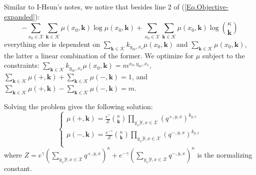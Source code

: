 \documentclass[12pt]{article}
\numberwithin{equation}{section}
\begin{document}
Similar to I-Hsun's notes, we notice that besides line 2 of (\ref{Eq.Objective-expanded}):
\begin{equation}
    - \sum_{x_0\in\mathcal{X}}\sum_{\mathbf{k}\in\mathcal{K}}\mu(x_0, \mathbf{k})\log\mu(x_0, \mathbf{k})
    + \sum_{x_0\in\mathcal{X}}\sum_{\mathbf{k}\in\mathcal{K}}\mu(x_0, \mathbf{k})\log{\kappa \choose \mathbf{k}}
    \label{Eq.EA-intermediate-obj}
\end{equation}
everything else is dependent on $\sum_{\mathbf{k}\in\mathcal{K}} k_{y_{0v}, x_v}\mu(x_0, \mathbf{k})$ and
$\sum_{\mathbf{k}\in\mathcal{K}}\mu(x_0, \mathbf{k})$, the latter a linear combination of the former. We optimize for $\mu$
subject to the constraints: $\sum_{\mathbf{k}\in\mathcal{K}} k_{y_{0v}, x_v}\mu(x_0, \mathbf{k}) = m^{x_0, y_{0v}, x_v}$,
$\sum_{\mathbf{k}\in\mathcal{K}}\mu(+, \mathbf{k}) + \sum_{\mathbf{k}\in\mathcal{K}}\mu(-, \mathbf{k}) = 1$, and
$\sum_{\mathbf{k}\in\mathcal{K}}\mu(+, \mathbf{k}) - \sum_{\mathbf{k}\in\mathcal{K}}\mu(-, \mathbf{k}) = m$.

Solving the problem gives the following solution:
\begin{equation}
    \begin{cases}
        \mu(+, \mathbf{k}) = \displaystyle{\frac{e^\gamma}{Z}{\kappa\choose\mathbf{k}} \prod_{y_\in\mathcal{Y}, x\in\mathcal{X}}\left(q^{+,y,x}\right)^{k_{y,x}}}    \\
        \mu(-, \mathbf{k}) = \displaystyle{\frac{e^{-\gamma}}{Z}{\kappa\choose\mathbf{k}} \prod_{y_\in\mathcal{Y}, x\in\mathcal{X}}\left(q^{-,y,x}\right)^{k_{y,x}}} \\
    \end{cases}
    \label{Eq.dist-form1}
\end{equation}
where $Z = e^\gamma\left(\sum_{y_\in\mathcal{Y}, x\in\mathcal{X}}q^{+,y,x}\right)^\kappa + e^{-\gamma}\left(\sum_{y_\in\mathcal{Y}, x\in\mathcal{X}}q^{-,y,x}\right)^\kappa$ is the normalizing constant.
\end{document}
